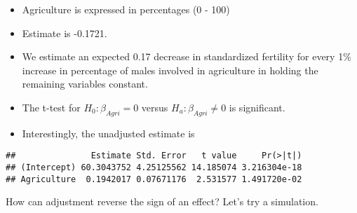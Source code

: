 \documentclass[12pt,openright,oneside,a4paper,chapter=TITLE,section=TITLE,subsection=Title,english,french,spanish,portugues,sumario=tradicional]{04-class-files/abntex2}
\newenvironment{Shaded}{\begin{snugshade}}{\end{snugshade}}
\newcommand{\DataTypeTok}[1]{\textcolor[rgb]{0.13,0.29,0.53}{#1}}
\newcommand{\DecValTok}[1]{\textcolor[rgb]{0.00,0.00,0.81}{#1}}
\newcommand{\FloatTok}[1]{\textcolor[rgb]{0.00,0.00,0.81}{#1}}
\newcommand{\KeywordTok}[1]{\textcolor[rgb]{0.13,0.29,0.53}{\textbf{#1}}}
\newcommand{\NormalTok}[1]{#1}
\newcommand{\OperatorTok}[1]{\textcolor[rgb]{0.81,0.36,0.00}{\textbf{#1}}}
\newcommand{\StringTok}[1]{\textcolor[rgb]{0.31,0.60,0.02}{#1}}
\providecommand{\tightlist}{%
  \setlength{\itemsep}{0pt}\setlength{\parskip}{0pt}}
\begin{document}
\begin{itemize}
\tightlist
\item
  Agriculture is expressed in percentages (0 - 100)
\item
  Estimate is -0.1721.
\item
  We estimate an expected 0.17 decrease in standardized fertility for every 1\% increase in percentage of males involved in agriculture in holding the remaining variables constant.
\item
  The t-test for \(H_0: \beta_{Agri} = 0\) versus \(H_a: \beta_{Agri} \neq 0\) is significant.
\item
  Interestingly, the unadjusted estimate is
\end{itemize}

\begin{Shaded}
\end{Shaded}

\begin{verbatim}
##               Estimate Std. Error   t value     Pr(>|t|)
## (Intercept) 60.3043752 4.25125562 14.185074 3.216304e-18
## Agriculture  0.1942017 0.07671176  2.531577 1.491720e-02
\end{verbatim}

How can adjustment reverse the sign of an effect? Let's try a simulation.

\begin{Shaded}
\end{Shaded}
\end{document}
